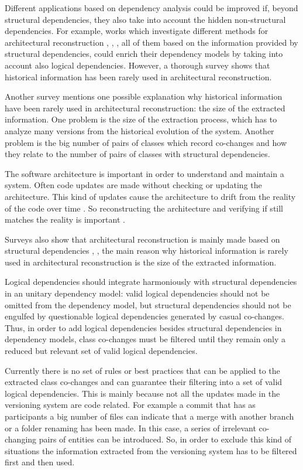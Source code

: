 Different applications based on dependency analysis could be improved if, beyond structural dependencies, they also take into account the hidden non-structural dependencies. For example, works  which investigate different methods for architectural reconstruction \cite{SoraConti}, \cite{SoraSem13}, \cite{PagerankENASE},  all of them based on the information provided by structural dependencies, could enrich their dependency models by taking into account also logical dependencies. However, a thorough survey \cite{sar} shows that historical information has been rarely used in architectural reconstruction. 

Another survey \cite{Shtern:2012:CMS:2332427.2332428} mentions one possible explanation why historical information have been rarely used in architectural reconstruction: the size of the extracted information. One problem is the size of the extraction process, which has to analyze many versions from the historical evolution of the system. Another problem is the big number of pairs of classes which record co-changes and how they relate to the number of pairs of classes with structural dependencies.

The software architecture is important in order to understand and maintain a system. Often code updates are made without checking or updating the architecture. This kind of updates cause the architecture to drift from the reality of the code over time \cite{sar}.
So reconstructing the architecture and verifying if still matches the reality is important \cite{Kalliamvakou2016}. 

Surveys also show that architectural reconstruction is mainly made based on structural dependencies \cite{Shtern:2012:CMS:2332427.2332428}, \cite{sar}, the main reason why historical information is rarely used in architectural reconstruction is the size of the extracted information.

Logical dependencies should integrate harmoniously with structural dependencies in an unitary dependency model: valid logical dependencies should not be omitted from the dependency model, but structural dependencies should not be engulfed by questionable logical dependencies generated by casual co-changes.  
Thus, in order to add logical dependencies besides structural dependencies in dependency models, class co-changes must be filtered until they remain only a reduced but relevant set of valid logical dependencies. 

Currently there is no set of rules or best practices that can be applied to the extracted class co-changes and can guarantee their filtering into a set of valid logical dependencies.
This is mainly because not all the updates made in the versioning system are code related. For example a commit that has as participants a big number of files can indicate that a merge with another branch or a folder renaming has been made. In this case, a series of irrelevant co-changing pairs of entities can be introduced. So, in order to exclude this kind of situations the information extracted from the versioning system has to be filtered first and then used.

